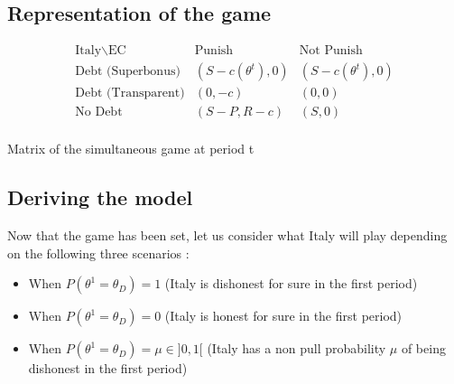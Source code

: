 \documentclass{article}
\begin{document}
\subsection{Representation of the game}
\begin{table}[h!]  
\centering  
$$\begin{array}{c|cc}  \text{Italy} \backslash \text{EC} & \text{Punish} & \text{Not Punish} \\  \hline  \text{Debt (Superbonus)} & (S-c(\theta^t), 0) & (S-c(\theta^t), 0) \\  \text{Debt (Transparent)} & (0, -c) & (0, 0) \\  \text{No Debt} & (S-P, R-c) & (S, 0) \\\end{array}$$  
\caption{Matrix of the simultaneous game at period t}  
\end{table}  

\subsection{Deriving the model}
Now that the game has been set, let us consider what Italy will play depending on the following three scenarios : 
\begin{itemize}
    \item When $P(\theta^1=\theta_D)=1$ (Italy is dishonest for sure in the first period)
    \item When $P(\theta^1=\theta_D)=0$ (Italy is honest for sure in the first period)
    \item When $P(\theta^1=\theta_D)=\mu\in]0,1[$ (Italy has a non pull probability $\mu$ of being dishonest in the first period)
\end{itemize}
\end{document}
